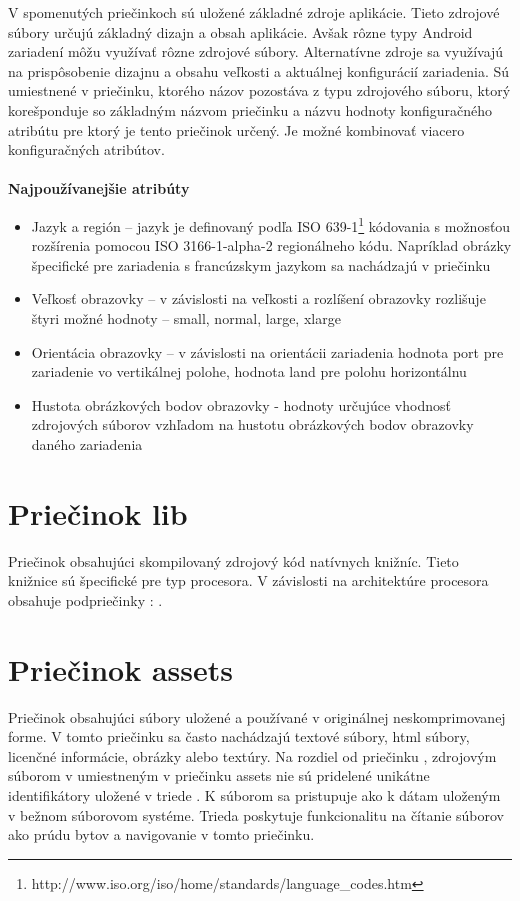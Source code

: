 \noindent V spomenutých priečinkoch sú uložené základné zdroje aplikácie. Tieto zdrojové súbory určujú základný dizajn a obsah aplikácie. Avšak rôzne typy Android zariadení môžu využívať rôzne zdrojové súbory. Alternatívne zdroje sa využívajú na prispôsobenie dizajnu a obsahu veľkosti a aktuálnej konfigurácií zariadenia. Sú umiestnené v priečinku, ktorého názov pozostáva z typu zdrojového súboru, ktorý korešponduje so základným názvom priečinku a názvu hodnoty konfiguračného atribútu pre ktorý je tento priečinok určený. Je možné kombinovať viacero konfiguračných atribútov.\\\\
\textbf{Najpoužívanejšie atribúty}
\begin{itemize}
\item Jazyk a región – jazyk je definovaný podľa ISO 639-1\footnote{http://www.iso.org/iso/home/standards/language\_codes.htm} kódovania s možnosťou rozšírenia pomocou ISO 3166-1-alpha-2 regionálneho kódu. Napríklad obrázky špecifické pre zariadenia s francúzskym jazykom sa nachádzajú v priečinku 
\item Veľkosť obrazovky –  v závislosti na veľkosti a rozlíšení obrazovky rozlišuje štyri možné hodnoty -- small, normal, large, xlarge
\item Orientácia obrazovky – v závislosti na orientácii zariadenia hodnota port pre zariadenie vo vertikálnej polohe, hodnota land pre polohu horizontálnu
\item Hustota obrázkových bodov obrazovky -  hodnoty určujúce vhodnosť zdrojových súborov vzhľadom na hustotu obrázkových bodov obrazovky daného zariadenia
\end{itemize}


\section{Priečinok lib}
Priečinok obsahujúci skompilovaný zdrojový kód natívnych knižníc. Tieto knižnice sú špecifické pre typ procesora. V závislosti na architektúre procesora obsahuje podpriečinky : .

\section{Priečinok assets}
Priečinok obsahujúci súbory uložené a používané v originálnej neskomprimovanej forme. V tomto priečinku sa často nachádzajú textové súbory, html súbory, licenčné informácie, obrázky alebo textúry. Na rozdiel od priečinku , zdrojovým súborom v umiestneným v priečinku assets nie sú pridelené unikátne identifikátory uložené v triede . K súborom sa pristupuje ako k dátam uloženým v bežnom súborovom systéme. Trieda  poskytuje funkcionalitu na čítanie súborov ako prúdu bytov a  navigovanie v tomto priečinku.

